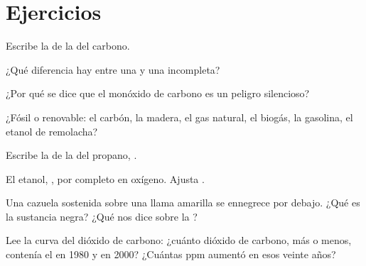 \section{Ejercicios}

\begin{exercise}[$\star$]\label{exo:g8:combustion-and-fuels:1}
Escribe la  de la  del carbono.
\end{exercise}

\begin{exercise}[$\star$]\label{exo:g8:combustion-and-fuels:2}
¿Qué diferencia hay entre una  y una incompleta?
\end{exercise}

\begin{exercise}[$\star$]\label{exo:g8:combustion-and-fuels:3}
¿Por qué se dice que el monóxido de carbono es un peligro silencioso?
\end{exercise}

\begin{exercise}[$\star$]\label{exo:g8:combustion-and-fuels:4}
¿Fósil o renovable: el carbón, la madera, el gas natural, el biogás, la
gasolina, el etanol de remolacha?
\end{exercise}

\begin{exercise}[$\star\star$]\label{exo:g8:combustion-and-fuels:5}
Escribe la  de la  del propano,
.
\end{exercise}

\begin{exercise}[$\star\star$]\label{exo:g8:combustion-and-fuels:6}
El etanol, ,  por completo en oxígeno. Ajusta
. %
\end{exercise}

\begin{exercise}[$\star\star$]\label{exo:g8:combustion-and-fuels:7}
Una cazuela sostenida sobre una llama amarilla se ennegrece por debajo.
¿Qué es la sustancia negra? ¿Qué nos dice sobre la ?
\end{exercise}

\begin{exercise}[$\star\star$]\label{exo:g8:combustion-and-fuels:8}
Lee la curva del dióxido de carbono: ¿cuánto dióxido de carbono, más o
menos, contenía el  en 1980 y en 2000? ¿Cuántas ppm aumentó en esos
veinte años?
\end{exercise}

